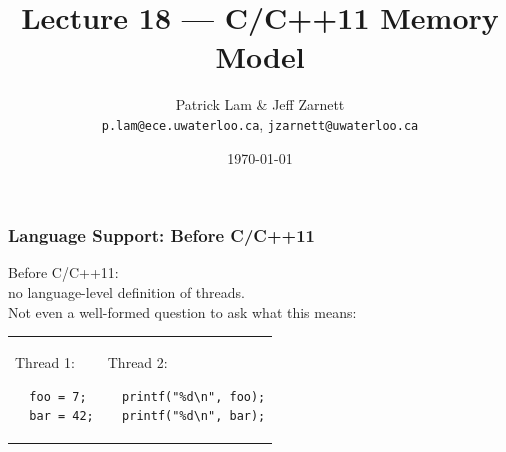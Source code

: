 

\title{Lecture 18 --- C/C++11 Memory Model }

\author{Patrick Lam \& Jeff Zarnett \\ \small \texttt{p.lam@ece.uwaterloo.ca}, \texttt{jzarnett@uwaterloo.ca}}
\date{\today}




\begin{frame}
  \titlepage

 \end{frame}

\begin{frame}[fragile]
  \frametitle{Language Support: Before C/C++11}


  
    Before C/C++11: \\ \qquad no language-level definition of threads.\\[1em]

    Not even a well-formed question to ask what this means:\\[.5em]
    \begin{tabular}{ll}
      \begin{minipage}{.2\textwidth}
        Thread 1:
        \begin{lstlisting}
  foo = 7;
  bar = 42;
        \end{lstlisting}
      \end{minipage} &
      \begin{minipage}{.4\textwidth}
        Thread 2:
        \begin{lstlisting}
  printf("%d\n", foo);
  printf("%d\n", bar);
        \end{lstlisting}
      \end{minipage}
    \end{tabular}
    ~\\[1em]
    
  
\end{frame}

